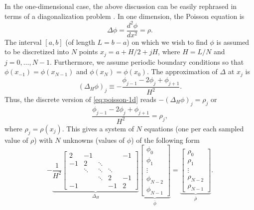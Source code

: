 In the one-dimensional case, the above discussion can be easily rephrased in terms of a diagonalization problem \cite{demanet2013fourier}.
In one dimension, the Poisson equation is
\begin{equation}\label{eq:poisson-1d}
    \Delta \phi = \frac{d^2 \phi}{dx^2} = \rho.
\end{equation}
The interval $[a, b]$ (of length $L = b-a$) on which we wish to find $\phi$ is assumed to be discretized into $N$ points $x_j = a + H/2 + jH$, where $H = L / N$ and $j=0,\dots, N-1$.
Furthermore, we assume periodic boundary conditions so that $\phi(x_{-1}) = \phi(x_{N-1})$ and $\phi(x_{N}) = \phi(x_0)$.
The approximation of $\Delta$ at $x_j$ is
\begin{equation*}
    (\Delta_H \phi)_j \equiv -\frac{\phi_{j-1} - 2\phi_j + \phi_{j+1}}{H^2}.
\end{equation*}
Thus, the discrete version of \autoref{eq:poisson-1d} reads $-(\Delta_H \phi)_j = \rho_j$ or
\begin{equation*}
    \frac{\phi_{j-1}-2\phi_j + \phi_{j+1}}{H^2} = \rho_j,
\end{equation*}
where $\rho_j = \rho(x_j)$.
This gives a system of $N$ equations (one per each sampled value of $\rho$) with $N$ unknowns (values of $\phi$) of the following form
\begin{equation}\label{eq:poisson-1d-matrix}
    -\underbrace{\frac{1}{H^2}
        \begin{bmatrix}
            2  & -1     &        &        & -1 \\
            -1 & 2      & \ddots &        &    \\
               & \ddots & \ddots & \ddots &    \\
               &        & \ddots & 2      & -1 \\
            -1 &        &        & -1     & 2
        \end{bmatrix}}_{\Delta_H}
    \underbrace{\begin{bmatrix}
            \phi_0     \\
            \phi_1     \\
            \vdots     \\
            \phi_{N-2} \\
            \phi_{N-1}
        \end{bmatrix}}_{\bar{\phi}}
    = \underbrace{\begin{bmatrix}
            \rho_0     \\
            \rho_1     \\
            \vdots     \\
            \rho_{N-2} \\
            \rho_{N-1}
        \end{bmatrix}}_{\bar{\rho}}.
\end{equation}
